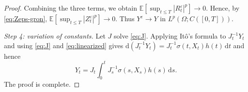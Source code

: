 \documentclass[10pt,a4paper]{amsart}
\newcommand{\E}{\mathbb{E}}
\newcommand{\dd}{\mathrm{d}}
\begin{document}
\begin{proof}
Combining the three terms, we obtain $\E[\sup_{t\le T}|R_t^\varepsilon|^p]\to0$.
Hence, by \eqref{eq:Zeps-gron}, $\E[\sup_{t\le T}|Z_t^\varepsilon|^p]\to0$.
Thus $Y^\varepsilon\to Y$ in $L^p(\Omega;C([0,T]))$.

\medskip
\noindent\emph{Step 4: variation of constants.}
Let $J$ solve \eqref{eq:J}. Applying It\^o's formula to $J_t^{-1}Y_t$ and using \eqref{eq:J} and \eqref{eq:linearized} gives
$\dd(J_t^{-1}Y_t)=J_t^{-1}\sigma(t,X_t)h(t)\,\dd t$ and hence
\[
Y_t=J_t\int_0^t J_s^{-1}\sigma(s,X_s)h(s)\,\dd s.
\]
The proof is complete.
\end{proof}
\end{document}
